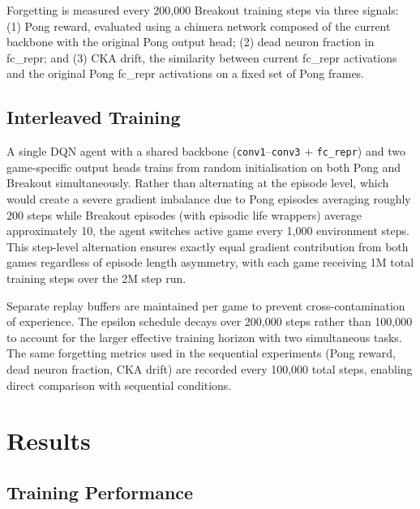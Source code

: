 \documentclass[a4paper]{article}
\begin{document}
Forgetting is measured every 200,000 Breakout training steps via three signals: (1) Pong
reward, evaluated using a chimera network composed of the current backbone with the original
Pong output head; (2) dead neuron fraction in fc\_repr; and (3) CKA drift, the similarity
between current fc\_repr activations and the original Pong fc\_repr activations on a fixed
set of Pong frames.

\subsection{Interleaved Training}

A single DQN agent with a shared backbone (\texttt{conv1}--\texttt{conv3} + \texttt{fc\_repr})
and two game-specific output heads trains from random initialisation on both Pong and
Breakout simultaneously. Rather than alternating at the episode level, which would create a
severe gradient imbalance due to Pong episodes averaging roughly 200 steps while Breakout
episodes (with episodic life wrappers) average approximately 10, the agent switches active
game every 1,000 environment steps. This step-level alternation ensures exactly equal
gradient contribution from both games regardless of episode length asymmetry, with each
game receiving 1M total training steps over the 2M step run.

Separate replay buffers are maintained per game to prevent cross-contamination of
experience. The epsilon schedule decays over 200,000 steps rather than 100,000 to account
for the larger effective training horizon with two simultaneous tasks. The same forgetting
metrics used in the sequential experiments (Pong reward, dead neuron fraction, CKA drift)
are recorded every 100,000 total steps, enabling direct comparison with sequential
conditions.

\section{Results}
\label{sec:results}

\subsection{Training Performance}
\end{document}
